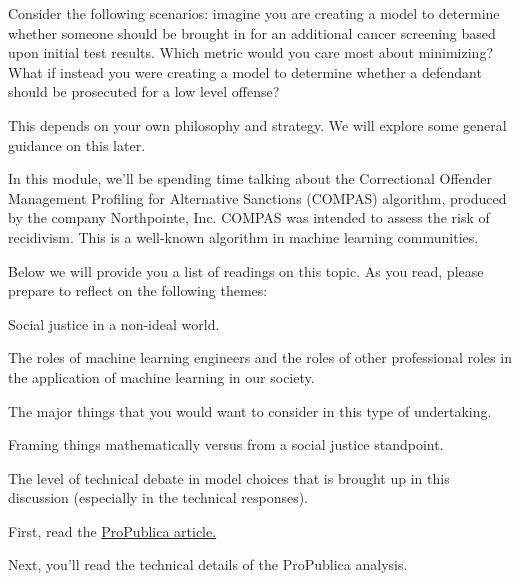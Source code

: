 \documentclass[assignment02_Solutions]{subfiles}
\begin{document}
\begin{exercise}
\item Consider the following scenarios: imagine you are creating a model to determine whether someone should be brought in for an additional cancer screening based upon initial test results. Which metric would you care most about minimizing? What if instead you were creating a model to determine whether a defendant should be prosecuted for a low level offense?

\begin{boxedsolution}
This depends on your own philosophy and strategy. We will explore some general guidance on this later.
\end{boxedsolution}
\ees

\end{exercise}

\begin{exercise}
In this module, we'll be spending time talking about the Correctional Offender Management Profiling for Alternative Sanctions (COMPAS) algorithm, produced by the company Northpointe, Inc. COMPAS was intended to assess the risk of recidivism. This is a well-known algorithm in machine learning communities. 

Below we will provide you a list of readings on this topic. As you read, please prepare to reflect on the following themes:
\bi
\item Social justice in a non-ideal world.
\item The roles of machine learning engineers and the roles of other professional roles in the application of machine learning in our society.
\item The major things that you would want to consider in this type of undertaking.
\item Framing things mathematically versus from a social justice standpoint.
\item The level of technical debate in model choices that is brought up in this discussion (especially in the technical responses). 
\ei

\bes
\item First, read the \href{https://www.propublica.org/article/machine-bias-risk-assessments-in-criminal-sentencing}{ProPublica article.}

\item Next, you'll read the technical details of the ProPublica analysis.


\end{exercise}
\end{document}
